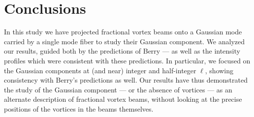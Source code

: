 \documentclass[10pt,a4paper,twoside]{article}
\renewcommand{\l}{\ell}
\begin{document}









\section{Conclusions}

In this study we have projected fractional vortex beams onto a Gaussian mode carried by a single mode fiber to study their Gaussian component. We analyzed our results, guided both by the predictions of Berry --- as well as the intensity profiles which were consistent with these predictions. In particular, we focused on the Gaussian components at (and near) integer and half-integer $\l$, showing consistency with Berry's predictions as well. Our results have thus demonstrated the study of the Gaussian component --- or the absence of vortices --- as an alternate description of fractional vortex beams, without looking at the precise positions of the vortices in the beams themselves.
\end{document}
